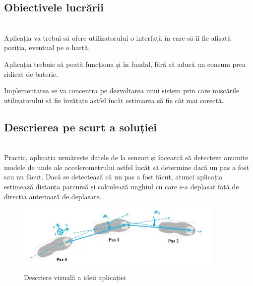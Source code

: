 \documentclass[12pt,a4paper]{article}
\begin{document}
\subsection{Obiectivele lucrării}
\\

Aplicația va trebui să ofere utilizatorului o interfață în care să îi fie afișată poziția, eventual pe o hartă.

Aplicația trebuie să poată funcționa și în fundal, fără să aducă un consum prea ridicat de baterie.

Implementarea se va concentra pe dezvoltarea unui sistem prin care mișcările utilizatorului să fie învățate astfel încât estimarea să fie cât mai corectă.\\


\subsection{Descrierea pe scurt a soluției}
\\

Practic, aplicația urmărește datele de la senzori și încearcă să detecteze anumite modele de unde ale accelerometrului astfel încât să determine dacă un pas a fost sau nu făcut. Dacă se detectează că un pas a fost făcut, atunci aplicația estimează distanța parcursă și calculează unghiul cu care s-a deplasat față de direcția anterioară de deplasare.

\begin{figure}[h]
\centering
\includegraphics[width=10cm]{figures/pedestrian-dead-reckoning-modified.jpg}
\caption{Descriere vizuală a ideii aplicației}
\label{fig:pdr_idea}
\end{figure}
\end{document}
